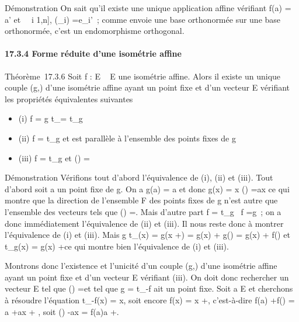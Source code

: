 \documentclass[]{article}
\begin{document}
Démonstration On sait qu'il existe une unique application affine
vérifiant f(a) = a' et \forall~~i \in {[}1,n{]},
\vecf(\vece_i)
=\vec e_i'~; comme \vecf
envoie une base orthonormée sur une base orthonormée, c'est un
endomorphisme orthogonal.

\paragraph{17.3.4 Forme réduite d'une isométrie affine}

Théorème~17.3.6 Soit f : E \rightarrow~ E une isométrie affine. Alors il existe un
unique couple (g,\overrightarrow\xi) d'une isométrie
affine ayant un point fixe et d'un vecteur
\overrightarrow\xi \in\overrightarrow
E vérifiant les propriétés équivalentes suivantes

\begin{itemize}
\itemsep1pt\parskip0pt
\item
  (i) f = g \cdot t_\overrightarrow\xi =
  t_\overrightarrow\xi \cdot g
\item
  (ii) f = t_\overrightarrow\xi \cdot g et
  \overrightarrow\xi est parallèle à l'ensemble des
  points fixes de g
\item
  (iii) f = t_\overrightarrow\xi \cdot g et
  \vecf(\overrightarrow\xi)
  =\overrightarrow \xi
\end{itemize}

Démonstration Vérifions tout d'abord l'équivalence de (i), (ii) et
(iii). Tout d'abord soit a un point fixe de g. On a g(a) = a et donc
g(x) = x \Leftrightarrow
\vecg(\overrightarrowax)
=\overrightarrow ax ce qui montre que la direction
\overrightarrowF de l'ensemble F des points fixes de
g n'est autre que l'ensemble des vecteurs
\overrightarrow\xi tels que
\vecg(\overrightarrow\xi)
=\overrightarrow \xi. Mais d'autre part f =
t_\overrightarrow\xi \cdot g
\rigtharrow~\vec f =\vec g~; on a donc
immédiatement l'équivalence de (ii) et (iii). Il nous reste donc à
montrer l'équivalence de (i) et (iii). Mais g \cdot
t_\overrightarrow\xi(x) = g(x
+\overrightarrow \xi) = g(x) +\vec
g(\overrightarrow\xi) = g(x) +\vec
f(\overrightarrow\xi) et
t_\overrightarrow\xi \cdot g(x) = g(x)
+\overrightarrow \xi ce qui montre bien l'équivalence
de (i) et (iii).

Montrons donc l'existence et l'unicité d'un couple
(g,\overrightarrow\xi) d'une isométrie affine ayant un
point fixe et d'un vecteur \overrightarrow\xi
\in\overrightarrow E vérifiant (iii). On doit donc
rechercher un vecteur \overrightarrow\xi
\in\overrightarrow E tel que
\vecf(\overrightarrow\xi)
=\overrightarrow \xi et tel que g =
t_-\overrightarrow\xi \cdot f ait un point fixe.
Soit a \in E et cherchons à résoudre l'équation
t_-\overrightarrow\xi \cdot f(x) = x, soit encore
f(x) = x +\overrightarrow \xi, c'est-à-dire f(a)
+\vec f(\overrightarrowax) = a
+\overrightarrow ax +\overrightarrow
\xi, soit \vecf(\overrightarrowax)
-\overrightarrow ax =\overrightarrow
f(a)a +\overrightarrow \xi.
\end{document}
